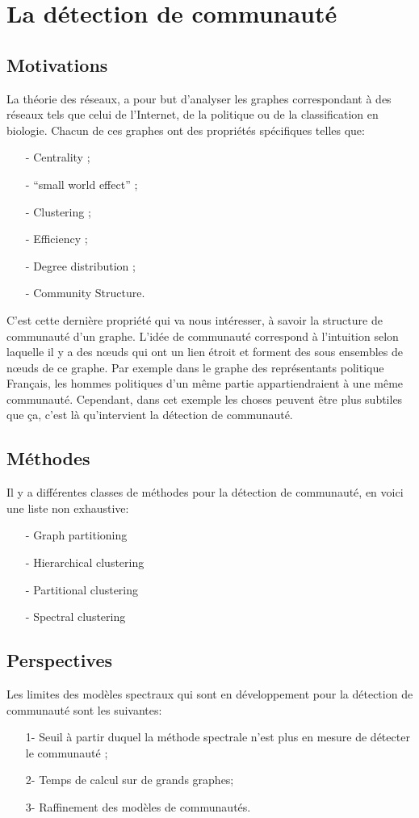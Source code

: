 \section{La détection de communauté}
\subsection{Motivations}
La théorie des réseaux, a pour but d'analyser les graphes correspondant à des réseaux tels que celui de l'Internet, de la politique ou de la classification en biologie.
Chacun de ces graphes ont des propriétés spécifiques telles que:
\begin{itemize}
 	\item[-] Centrality ;
 	\item[-] ``small world effect'' ;
 	\item[-] Clustering ;
 	\item[-] Efficiency ;
 	\item[-] Degree distribution ; 
 	\item[-] Community Structure.\\
 \end{itemize}
 C'est cette dernière propriété qui va nous intéresser, à savoir la structure de communauté d'un graphe.
 L'idée de communauté correspond à l'intuition selon laquelle il y a des nœuds qui ont un lien étroit et forment des sous ensembles de nœuds de ce graphe.
 Par exemple dans le graphe des représentants politique Français, les hommes politiques d'un même partie appartiendraient à une même communauté.
 Cependant, dans cet exemple les choses peuvent être plus subtiles que ça, c'est là qu'intervient la détection de communauté.

\subsection{Méthodes}
Il y a différentes classes de méthodes pour la détection de communauté, en voici une liste non exhaustive:
\begin{itemize}
	\item[-] Graph partitioning
	\item[-] Hierarchical clustering
	\item[-] Partitional clustering
	\item[-] Spectral clustering \\
\end{itemize}
\subsection{Perspectives}
Les limites des modèles spectraux qui sont en développement pour la détection de communauté sont les suivantes:
\begin{itemize}
	\item[1-] Seuil à partir duquel la méthode spectrale n'est plus en mesure de détecter le communauté ;  
	\item[2-] Temps de calcul sur de grands graphes;  
	\item[3-] Raffinement des modèles de communautés.  
\end{itemize}

